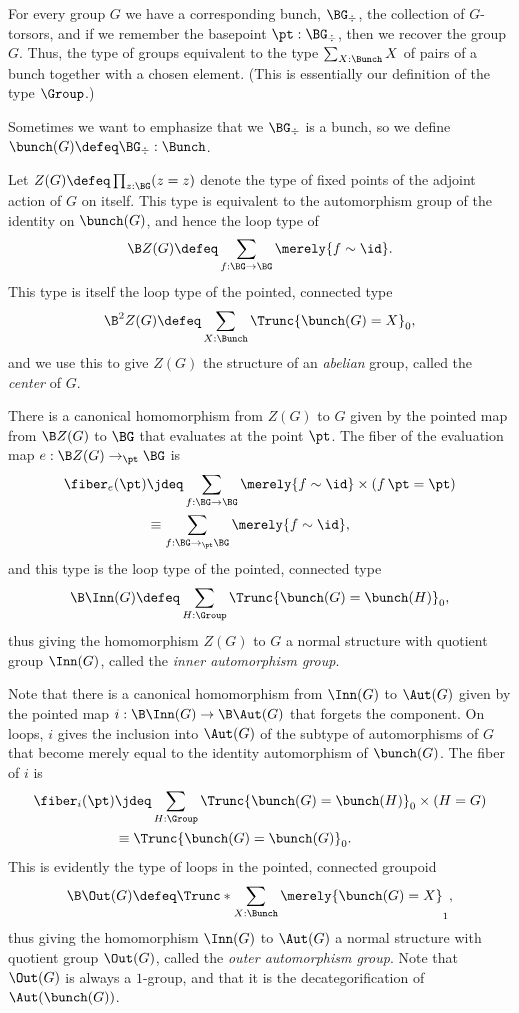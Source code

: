 For every group $G$ we have a corresponding bunch, $\BG_\div$,
\ie{} the collection of $G$-torsors,
and if we remember the basepoint $\pt : \BG_\div$,
then we recover the group $G$.
Thus, the type of groups equivalent to the type
$\sum_{X : \Bunch} X$
of pairs of a bunch together with a chosen element.
(This is essentially our definition of the type $\Group$.)

Sometimes we want to emphasize that we $\BG_\div$ is a bunch,
so we define $\bunch(G) \defeq \BG_\div : \Bunch$.

\begin{definition}
  \label{def:center}
  Let $Z(G) \defeq \prod_{z : \BG}(z = z)$ denote the type of fixed points of the adjoint action of $G$ on itself.
  This type is equivalent to the automorphism group of the identity on $\bunch(G)$,
  and hence the loop type of
  \[
    \B Z(G) \defeq \sum_{f : \BG \to \BG} \merely{f \sim \id}.
  \]
  This type is itself the loop type of the pointed, connected type
  \[
    \B^2Z(G) \defeq \sum_{X : \Bunch}\Trunc{\bunch(G) = X}_0,
  \]
  and we use this to give $Z(G)$ the structure of an \emph{abelian} group,
  called the \emph{center} of $G$.
\end{definition}
There is a canonical homomorphism from $Z(G)$ to $G$ given by the pointed map
from $\B Z(G)$ to $\BG$ that evaluates at the point $\pt$.
The fiber of the evaluation map $e : \B Z(G) \to_\pt \BG$ is
\begin{align*}
  \fiber_e(\pt)
  &\jdeq \sum_{f : \BG \to \BG} \merely{f \sim \id} \times (\mathop f \pt = \pt) \\
  &\equiv \sum_{f : \BG \to_\pt \BG} \merely{f \sim \id},
\end{align*}
and this type is the loop type of the pointed, connected type
\[
  \B\Inn(G) \defeq \sum_{H : \Group} \Trunc{\bunch(G) = \bunch(H)}_0,
\]
thus giving the homomorphism $Z(G)$ to $G$ a normal structure with
quotient group $\Inn(G)$, called the \emph{inner automorphism group}.

Note that there is a canonical homomorphism from $\Inn(G)$ to $\Aut(G)$
given by the pointed map $i : \B\Inn(G) \to \B\Aut(G)$ that forgets the component.
On loops, $i$ gives the inclusion into $\Aut(G)$ of the subtype of automorphisms of $G$
that become merely equal to the identity automorphism of $\bunch(G)$.
The fiber of $i$ is
\begin{align*}
  \fiber_i(\pt)
  &\jdeq \sum_{H : \Group} \Trunc{\bunch(G) = \bunch(H)}_0 \times (H = G) \\
  &\equiv \Trunc{\bunch(G) = \bunch(G)}_0.
\end{align*}
This is evidently the type of loops in the pointed, connected groupoid
\[
  \B\Out(G) \defeq \Trunc*{\sum_{X : \Bunch}\merely{\bunch(G) = X}}_1,
\]
thus giving the homomorphism $\Inn(G)$ to $\Aut(G)$ a normal structure with
quotient group $\Out(G)$, called the \emph{outer automorphism group}.
Note that $\Out(G)$ is always a $1$-group,
and that it is the decategorification of $\Aut(\bunch(G))$.

